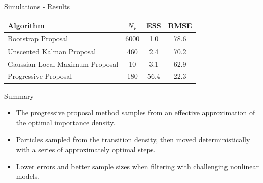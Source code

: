 \documentclass{beamer}
\begin{document}
\begin{frame}{Simulations - Results}
\begin{table}
\centering
\begin{tabular}{l||c|c|c}
Algorithm                                & $N_F$ & ESS  & RMSE \\
\hline
Bootstrap Proposal                       &  6000 &  1.0 & 78.6 \\
Unscented Kalman Proposal                &   460 &  2.4 & 70.2 \\
Gaussian Local Maximum Proposal          &    10 &  3.1 & 62.9 \\
Progressive Proposal                     &   180 & 56.4 & 22.3 \\
\end{tabular}
\end{table}
\end{frame}

\begin{frame}{Summary}
\begin{itemize}
 \item The progressive proposal method samples from an effective approximation of the optimal importance density.
 \item Particles sampled from the transition density, then moved deterministically with a series of approximately optimal steps.
 \item Lower errors and better sample sizes when filtering with challenging nonlinear models.
\end{itemize}
\end{frame}

\begin{frame}

\end{frame}
\end{document}
